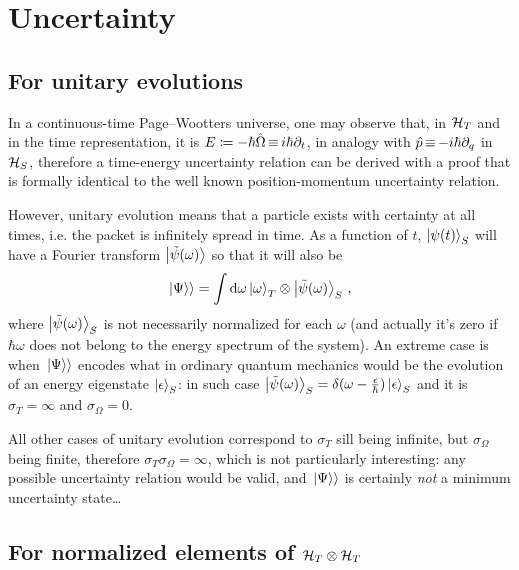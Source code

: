 \section{Uncertainty}

\subsection*{For unitary evolutions}

In a continuous-time Page--Wootters universe,
one may observe that,
in $\mathcal{H}_T$ and in the time representation,
it is $E \coloneqq -\hbar\hat{\Omega} \operatorname*{\equiv} i\hbar\partial_{t}$,
in analogy with $\hat{p} \operatorname*{\equiv} -i\hbar\partial_{q}$ in $\mathcal{H}_S$,
therefore a time-energy uncertainty relation can be derived
with a proof that is formally identical to the well known
position-momentum uncertainty relation.

However, unitary evolution means that a particle exists with
certainty at all times, i.e. the packet
is infinitely spread in time.
%
As a function of $t$, $\ket{\psi(t)}_S$ will have a Fourier transform
$\ket{\tilde{\psi}(\omega)}$
so that it will also be
\begin{equation}\label{eq:pwfourier}
  \left.\left| \Psi \right\rangle\right\rangle = \int \dd \omega \ket{\omega}_T \otimes \ket{\tilde{\psi}(\omega)}_S \, \text{,}
\end{equation}
where $\ket{\tilde{\psi}(\omega)}_S$ is not necessarily normalized for each $\omega$
(and actually it's zero if $\hbar\omega$ does not belong to the energy spectrum of the system).
An extreme case is when $\left.\left| \Psi \right\rangle\right\rangle$ encodes what in ordinary quantum mechanics would be the evolution
of an energy eigenstate $\ket{\epsilon}_S$: in such case
$\ket{\tilde{\psi}(\omega)}_S = \delta(\omega - \frac{\epsilon}{\hbar})\ket{\epsilon}_S$
and it is $\sigma_{T} = \infty$ and $\sigma_{\Omega} = 0$.

All other cases of unitary evolution correspond to $\sigma_{T}$
sill being infinite, but $\sigma_{\Omega}$ being finite, therefore
$\sigma_{T}\sigma_{\Omega} = \infty$, which is not particularly interesting:
any possible uncertainty relation would be valid, and $\left.\left| \Psi \right\rangle\right\rangle$
is certainly \emph{not} a minimum uncertainty state\dots 

\subsection*{For normalized elements of $\mathcal{H}_T \otimes \mathcal{H}_T$}\label{sec:for-normalized-elements}

